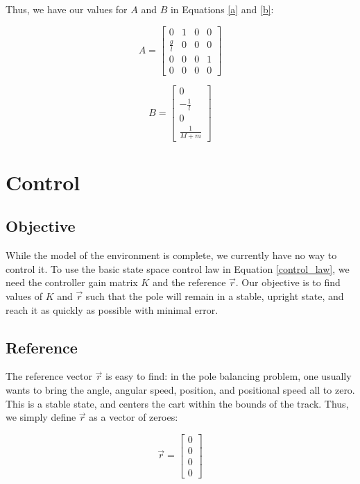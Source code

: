 \documentclass[11pt]{article}
\begin{document}
Thus, we have our values for $A$ and $B$ in Equations \ref{a} and \ref{b}:

\begin{equation} \label{a}
    \displaystyle A = \begin{bmatrix}
        0 & 1 & 0 & 0 \\
        \frac{g}{l} & 0 & 0 & 0 \\
        0 & 0 & 0 & 1 \\
        0 & 0 & 0 & 0
    \end{bmatrix}
\end{equation}

\begin{equation} \label{b}
    \displaystyle B = \begin{bmatrix}
        0 \\
        - \frac{1}{l} \\
        0 \\
        \frac{1}{M + m}
    \end{bmatrix}
\end{equation}

\section{Control}

\subsection{Objective}

While the model of the environment is complete, we currently have no way to control it. To use the basic state space control law in Equation \ref{control_law}, we need the controller gain matrix $K$ and the reference $\vec{r}$. Our objective is to find values of $K$ and $\vec{r}$ such that the pole will remain in a stable, upright state, and reach it as quickly as possible with minimal error.

\subsection{Reference}

The reference vector $\vec{r}$ is easy to find: in the pole balancing problem, one usually wants to bring the angle, angular speed, position, and positional speed all to zero. This is a stable state, and centers the cart within the bounds of the track. Thus, we simply define $\vec{r}$ as a vector of zeroes:

\begin{equation}
    \displaystyle
    \vec{r} = \begin{bmatrix}
        0 \\
        0 \\
        0 \\
        0
    \end{bmatrix}
\end{equation}
\end{document}

